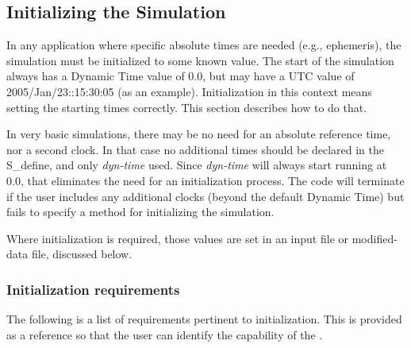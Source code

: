 \subsection{Initializing the Simulation}
In any application where specific absolute times are needed (e.g.,
ephemeris), the simulation must be initialized to some known value.  The
start of the simulation always has a Dynamic Time value of 0.0, but may
have a UTC value of 2005/Jan/23::15:30:05 (as an example).
Initialization in this context means setting the starting times
correctly.  This section describes how to do that.




In very basic simulations, there may be no need for an absolute
reference time, nor a second clock.  In that case no additional times
should be declared in the S\_define, and only \textit{dyn-time} used.  Since
\textit{dyn-time} will always start running at 0.0, that eliminates the need for
an initialization process.  The code will terminate if the user
includes any additional clocks (beyond the default Dynamic Time) but
fails to specify a method for initializing the simulation.

Where initialization is required, those values are set in an input file
or modified-data file, discussed below.

\subsubsection{Initialization requirements}
The following is a list of requirements pertinent to initialization.
This is provided as a reference so that the user can identify the
capability of the \timeDesc.


